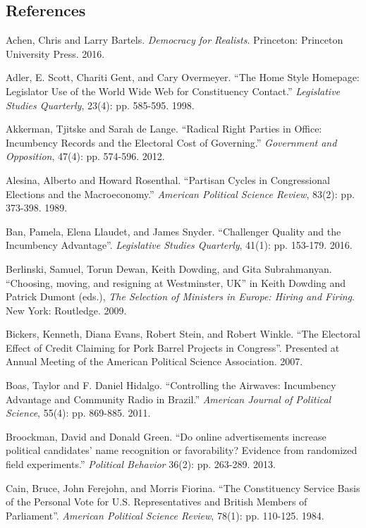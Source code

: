 \documentclass[letter,12pt]{article}
\begin{document}
\subsection*{References}
\begin{hangparas}{.25in}{1}
Achen, Chris and Larry Bartels. \textit{Democracy for Realists}. Princeton: Princeton University Press. 2016.

Adler, E. Scott, Chariti Gent, and Cary Overmeyer. ``The Home Style Homepage: Legislator Use of the World Wide Web for Constituency Contact.'' \textit{Legislative Studies Quarterly}, 23(4): pp. 585-595. 1998.

Akkerman, Tjitske and Sarah de Lange. ``Radical Right Parties in Office: Incumbency Records and the Electoral Cost of Governing.'' \textit{Government and Opposition}, 47(4): pp. 574-596. 2012.

Alesina, Alberto and Howard Rosenthal. ``Partisan Cycles in Congressional Elections and the Macroeconomy.'' \textit{American Political Science Review}, 83(2): pp. 373-398. 1989.

Ban, Pamela, Elena Llaudet, and James Snyder. ``Challenger Quality and the Incumbency Advantage''. \textit{Legislative Studies Quarterly}, 41(1): pp. 153-179. 2016.

Berlinski, Samuel, Torun Dewan, Keith Dowding, and Gita Subrahmanyan. ``Choosing, moving, and resigning at Westminster, UK'' in Keith Dowding and Patrick Dumont (eds.), \textit{The Selection of Ministers in Europe: Hiring and Firing}. New York: Routledge. 2009.

Bickers, Kenneth, Diana Evans, Robert Stein, and Robert Winkle. ``The Electoral Effect of Credit Claiming for Pork Barrel Projects in Congress''. Presented at Annual Meeting of the American Political Science Association. 2007.

Boas, Taylor and F. Daniel Hidalgo. ``Controlling the Airwaves: Incumbency Advantage and Community Radio in Brazil.'' \textit{American Journal of Political Science}, 55(4): pp. 869-885. 2011.

Broockman, David and Donald Green. ``Do online advertisements increase political candidates' name recognition or favorability? Evidence from randomized field experiments.'' \textit{Political Behavior} 36(2): pp. 263-289. 2013.

Cain, Bruce, John Ferejohn, and Morris Fiorina. ``The Constituency Service Basis of the Personal Vote for U.S. Representatives and British Members of Parliament''. \textit{American Political Science Review}, 78(1): pp. 110-125. 1984.


\end{hangparas}
\end{document}
